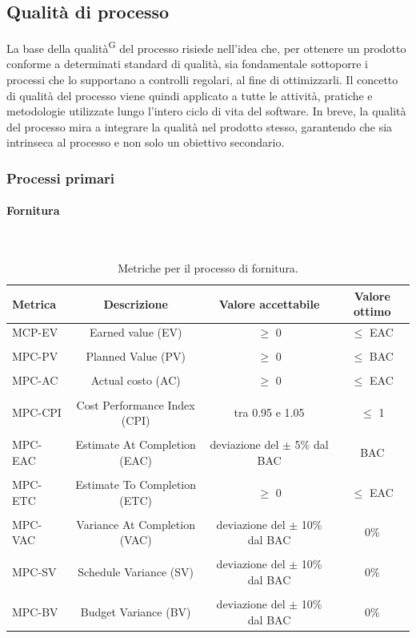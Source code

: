 \documentclass[8pt]{article}
\newcommand{\glossterm}[1]{#1\textsuperscript{G}} %
\newcommand{\subsubsubsection}[1]{\paragraph{#1}\mbox{}\\}
\begin{document}
\subsection{Qualità di processo}
La base della \glossterm{qualità} del processo risiede nell'idea che, per ottenere un prodotto conforme a determinati standard di qualità, sia fondamentale sottoporre i processi che lo supportano a controlli regolari, al fine di ottimizzarli. Il concetto di qualità del processo viene quindi applicato a tutte le attività, pratiche e metodologie utilizzate lungo l'intero ciclo di vita del software. In breve, la qualità del processo mira a integrare la qualità nel prodotto stesso, garantendo che sia intrinseca al processo e non solo un obiettivo secondario.
\subsubsection{Processi primari}
\subsubsubsection{Fornitura} 
\begin{table}[h]	
	\centering
	\begin{tabular}{lccc}
		\toprule
		\textbf{Metrica}& \textbf{Descrizione} & \textbf{Valore accettabile} & \textbf{Valore ottimo} \\
		\midrule
		MCP-EV & Earned value (EV) & $\geq$ 0 & $\leq$ EAC \\\\
		MPC-PV & Planned Value (PV) & $\geq$ 0 & $\leq$ BAC\\\\
		MPC-AC & Actual costo (AC) & $\geq$ 0 & $\leq$ EAC\\\\
		MPC-CPI & Cost Performance Index (CPI) & tra 0.95 e 1.05 & $\leq$ 1\\\\
		MPC-EAC & Estimate At Completion (EAC) & deviazione del $\pm$ 5\% dal BAC & BAC\\\\
		MPC-ETC & Estimate To Completion (ETC) & $\geq $ 0 & $\leq$ EAC\\\\
		MPC-VAC & Variance At Completion (VAC) & deviazione del $\pm$ 10\% dal BAC & 0\%\\\\
		MPC-SV & Schedule Variance (SV) & deviazione del $\pm$ 10\% dal BAC & 0\%\\\\
		MPC-BV & Budget Variance (BV) & deviazione del $\pm$ 10\% dal BAC  & 0\%\\
		\bottomrule
	\end{tabular}
	\caption{Metriche per il processo di fornitura.}
	\label{table:Tabella metriche per il processo di fornitura.}
\end{table}
\end{document}
